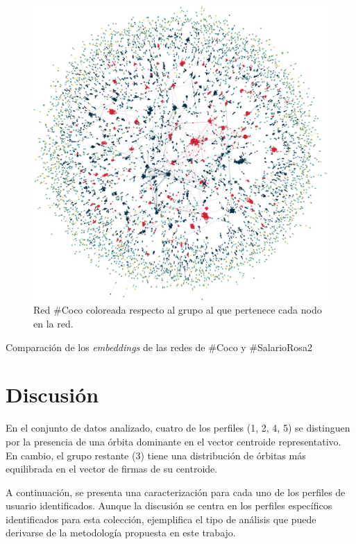 \begin{figure}
    \centering
    \includegraphics[width=.75\textwidth]{images/Coco.png}
    \caption{Red \#Coco coloreada respecto al grupo al que pertenece cada nodo en la red.}
    \label{fig:net-coco}
\end{figure}


\begin{table}[h]
\centering
        \newline
        \caption{Comparación de los \textit{embeddings} de las redes de \#Coco y \#SalarioRosa2}
        \label{table:comparacionCocoSalarioRosa}
\end{table}


\section{Discusión}
En el conjunto de datos analizado, cuatro de los perfiles (1, 2, 4, 5) se distinguen por la presencia de una órbita dominante en el vector centroide representativo. En cambio, el grupo restante (3) tiene una distribución de órbitas más equilibrada en el vector de firmas de su centroide.

A continuación, se presenta una caracterización para cada uno de los perfiles de usuario identificados. Aunque la discusión se centra en los perfiles específicos identificados para esta colección, ejemplifica el tipo de análisis que puede derivarse de la metodología propuesta en este trabajo.   


